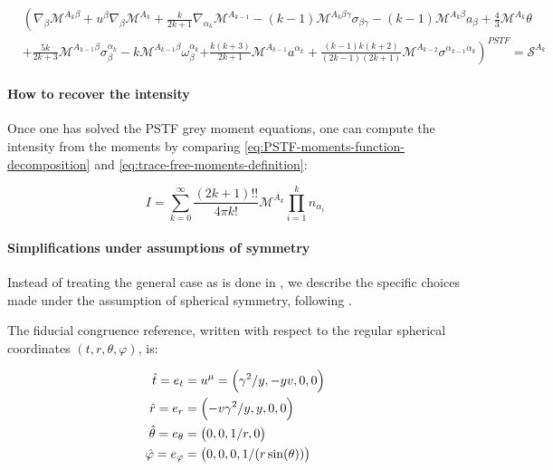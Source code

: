 \documentclass[main.tex]{subfiles}
\begin{document}
\begin{equation} \label{eq:PSTF-grey-moment-equations}
  \begin{split}
    &\left( \nabla _\beta \mathscr M ^{A_k \beta} + u^\beta \nabla_\beta \mathscr M ^{A_k}
    + \frac{k}{2k+1} \nabla_{\alpha_k} \mathscr M ^{A_{k-1}}
    - (k-1) \mathscr M ^{A_k \beta \gamma} \sigma_{\beta \gamma} \right.
    - (k-1) \mathscr M ^{A_k \beta} a_\beta
    + \frac{4}{3} \mathscr M ^{A_k} \theta \\
    &+ \frac{5k}{2k+3} \mathscr M ^{A_{k-1} \beta} \sigma_\beta^{\alpha_k}
    - k \mathscr M ^{A_{k-1} \beta} \omega_\beta ^{\alpha_k}
    \left.+ \frac{k (k+3)}{2k+1} \mathscr M ^{A_{k-1}} a^{\alpha_k}
    + \frac{(k-1) k (k+2) }{(2k-1) (2k+1)} \mathscr M ^{A_{k-2}} \sigma^{\alpha_{k-1} \alpha_k} \right)^{PSTF} = \mathscr S ^{A_k}
  \end{split}
\end{equation}

\paragraph{How to recover the intensity}

Once one has solved the PSTF grey moment equations, one can compute the intensity from the moments by comparing \eqref{eq:PSTF-moments-function-decomposition} and \eqref{eq:trace-free-moments-definition}:

\begin{equation}
  I = \sum _{k=0}   ^{\infty} \frac{(2k+1)!!}{4 \pi k!} \mathscr M^{A_k} \prod_{i=1}^k n_{\alpha_i}
\end{equation}

\paragraph{Simplifications under assumptions of symmetry}

Instead of treating the general case as is done in \cite[]{Thorne:1981feb}, we describe the specific choices made under the assumption of spherical symmetry, following \cite[]{ThorneFLammmangZytkow:1981feb}.

The fiducial congruence reference, written with respect to the regular spherical coordinates \((t, r, \theta, \varphi)\), is:

\begin{subequations}
\begin{align}
  \hat{t} = e_t &= u^\mu = \qty(\gamma^2 / y, -yv, 0,0)  \\
  \hat{r} = e_r &= \qty(-v \gamma^2 /y, y, 0, 0) \\
  \hat{\theta} =  e_\theta &= \qty(0,0, 1/r, 0)  \\
  \hat{\varphi} =  e_ \varphi &= \qty(0,0,0, 1/(r \sin(\theta)))
\end{align}
\end{subequations}
\end{document}

